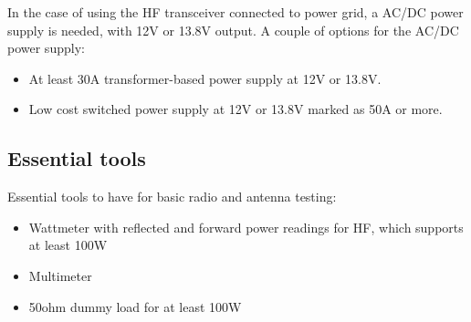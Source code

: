 In the case of using the HF transceiver connected to power grid, a AC/DC
power supply is needed, with 12V or 13.8V output. A couple of options for
the AC/DC power supply:


\begin{itemize}
\item At least 30A transformer-based power supply at 12V or 13.8V.
\item Low cost switched power supply at 12V or 13.8V marked as 50A or more.
\end{itemize}

\subsection{Essential tools}

Essential tools to have for basic radio and antenna testing:
\begin{itemize}
\item Wattmeter with reflected and forward power readings for HF, which
  supports at least 100W
\item Multimeter
\item 50ohm dummy load for at least 100W
\end{itemize}


